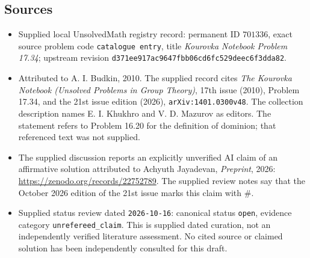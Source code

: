 \documentclass[11pt]{article}
\begin{document}
\subsection{Sources}
\begin{itemize}
\item Supplied local UnsolvedMath registry record: permanent ID \(701336\), exact source problem code \texttt{catalogue entry}, title \emph{Kourovka Notebook Problem 17.34}; upstream revision \texttt{d371ee917ac9647fbb06cd6fc529deec6f3dda82}.
\item Attributed to A. I. Budkin, 2010. The supplied record cites \emph{The Kourovka Notebook (Unsolved Problems in Group Theory)}, 17th issue (2010), Problem 17.34, and the 21st issue edition (2026), \texttt{arXiv:1401.0300v48}. The collection description names E. I. Khukhro and V. D. Mazurov as editors. The statement refers to Problem 16.20 for the definition of dominion; that referenced text was not supplied.
\item The supplied discussion reports an explicitly unverified AI claim of an affirmative solution attributed to Achyuth Jayadevan, \emph{Preprint}, 2026: \url{https://zenodo.org/records/22752789}. The supplied review notes say that the October 2026 edition of the 21st issue marks this claim with \(\#\).
\item Supplied status review dated \texttt{2026-10-16}: canonical status \texttt{open}, evidence category \texttt{unrefereed\_claim}. This is supplied dated curation, not an independently verified literature assessment. No cited source or claimed solution has been independently consulted for this draft.
\end{itemize}
\end{document}
